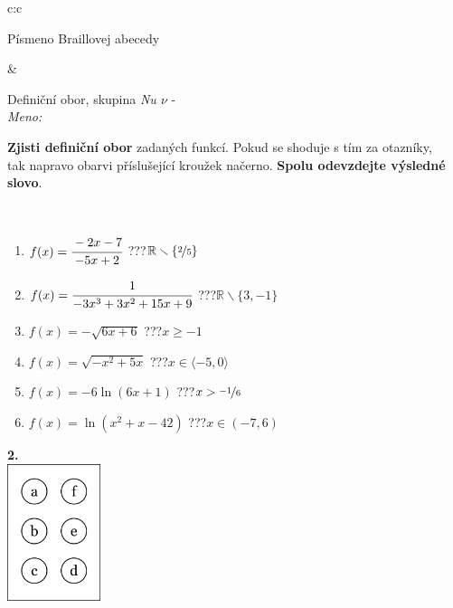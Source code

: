 \documentclass[10pt]{report}
\begin{document}
\begin{tabular}{c:c}
\begin{minipage}[c][104.5mm][t]{0.5\linewidth}
\begin{center}
\begin{minipage}{0.20\linewidth}
\begin{center}
{\small Písmeno Braillovej abecedy}
\end{center}
\end{minipage}
\end{center}
\end{minipage}
&
\begin{minipage}[c][104.5mm][t]{0.5\linewidth}
\begin{center}
\vspace{7mm}
{\huge Definiční obor, skupina \textit{Nu $\nu$} -}\\[5mm]
\textit{Meno:}\phantom{xxxxxxxxxxxxxxxxxxxxxxxxxxxxxxxxxxxxxxxxxxxxxxxxxxxxxxxxxxxxxxxxx}\\[5mm]
\begin{minipage}{0.95\linewidth}
\textbf{Zjisti definiční obor} zadaných funkcí. Pokud se shoduje s tím za otazníky,\\tak napravo obarvi příslušející kroužek načerno. \textbf{Spolu odevzdejte výsledné slovo}.
\end{minipage}
\\[1mm]
\begin{minipage}{0.79\linewidth}
\begin{center}
\begin{varwidth}{\linewidth}
\begin{enumerate}
\normalsizerrr
\item $f(x)=\cfrac{-2x-7}{-5x+2}$\quad \dotfill\; ???\;\dotfill \quad $\mathbb{R}\smallsetminus\{\nicefrac{2}{5}\}$
\item $f(x)=\cfrac{1}{-3x^3+3x^2+15x+9}$\quad \dotfill\; ???\;\dotfill \quad $\mathbb{R}\smallsetminus\{3,-1\}$
\item $f(x)=-\sqrt{6x+6}$\quad \dotfill\; ???\;\dotfill \quad $x\geq-1$
\item $f(x)=\sqrt{-x^2+5x}$\quad \dotfill\; ???\;\dotfill \quad $x\in\langle-5 , 0\rangle$
\item $f(x)=-6\ln{(6x+1)}$\quad \dotfill\; ???\;\dotfill \quad $x>\nicefrac{-1}{6}$
\item $f(x)=\ln{(x^2+x-42)}$\quad \dotfill\; ???\;\dotfill \quad $x\in(-7 , 6)$
\end{enumerate}
\end{varwidth}
\end{center}
\end{minipage}
\begin{minipage}{0.20\linewidth}
\begin{center}
{\Huge\bfseries 2.} \\[2mm]
\includegraphics[height=40mm]{../images/braille.png}

\end{center}
\end{minipage}
\end{center}
\end{minipage}
\end{tabular}
\end{document}
